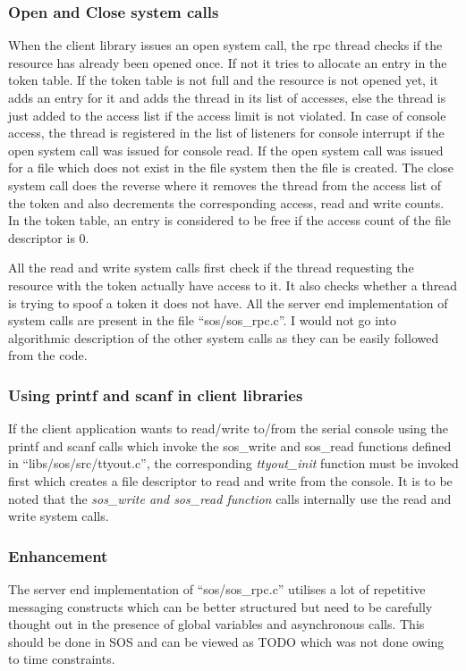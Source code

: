 \documentclass[a4paper, 11pt]{article}
\begin{document}
\subsubsection{Open and Close system calls}
When the client library issues an open system call, the rpc thread
checks if the resource has already been opened once. If not it tries
to allocate an entry in the token table. If the token table is not
full and the resource is not opened yet, it adds an entry for it and
adds the thread in its list of accesses, else the thread is just added
to the access list if the access limit is not violated. In case of
console access, the thread is registered in the list of listeners for
console interrupt if the open system call was issued for console
read. If the open system call was issued for a file which does not
exist in the file system then the file is created. The close system
call does the reverse where it removes the thread from the access list
of the token and also decrements the corresponding access, read and
write counts. In the token table, an entry is considered to be free if
the access count of the file descriptor is 0. 

 All the read and write
system calls first check if the thread requesting the resource with
the token actually have access to it. It also checks whether a thread
is trying to spoof a token it does not have. All the server end
implementation of system calls are present in the file
``sos/sos\_rpc.c''. I would not go into algorithmic description of the
other system calls as they can be easily followed from the code.

\subsubsection{Using printf and scanf in client libraries} 
If the client application wants to read/write to/from the serial
console using the printf and scanf calls which invoke the sos\_write
and sos\_read functions defined in ``libs/sos/src/ttyout.c'', the
corresponding \textit{ttyout\_init} function must be invoked first
which creates a file descriptor to read and write from the console. It
is to be noted that the \textit{sos\_write and sos\_read function} calls
internally use the read and write system calls.
\subsubsection{Enhancement}
The server end implementation of ``sos/sos\_rpc.c'' utilises a lot of
repetitive messaging constructs which can be better structured but
need to be carefully thought out in the presence of global variables
and asynchronous calls. This should be done in SOS and can be viewed
as TODO which was not done owing to time constraints.
\end{document}
